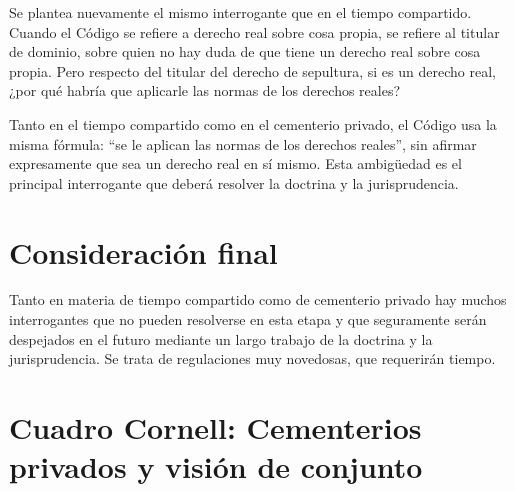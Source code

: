 \documentclass[12pt,oneside]{book}
\begin{document}
Se plantea nuevamente el mismo interrogante que en el tiempo compartido. Cuando el Código se refiere a derecho real sobre cosa propia, se refiere al titular de dominio, sobre quien no hay duda de que tiene un derecho real sobre cosa propia. Pero respecto del titular del derecho de sepultura, si es un derecho real, ¿por qué habría que aplicarle las normas de los derechos reales?

\begin{important}
Tanto en el tiempo compartido como en el cementerio privado, el Código usa la misma fórmula: ``se le aplican las normas de los derechos reales'', sin afirmar expresamente que sea un derecho real en sí mismo. Esta ambigüedad es el principal interrogante que deberá resolver la doctrina y la jurisprudencia.
\end{important}

\section{Consideración final}

Tanto en materia de tiempo compartido como de cementerio privado hay muchos interrogantes que no pueden resolverse en esta etapa y que seguramente serán despejados en el futuro mediante un largo trabajo de la doctrina y la jurisprudencia. Se trata de regulaciones muy novedosas, que requerirán tiempo.

\section{Cuadro Cornell: Cementerios privados y visión de conjunto}
\end{document}
